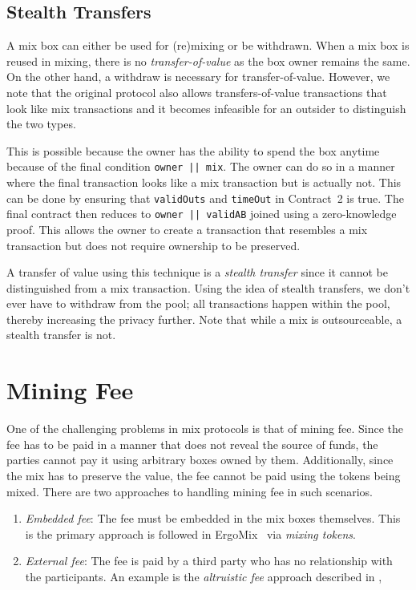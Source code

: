 \documentclass[runningheads]{llncs}
\newcommand{\ergomix}{ErgoMix\xspace}
\begin{document}
\subsection{Stealth Transfers}

A mix box can either be used for (re)mixing or be withdrawn. When a mix box is reused in mixing, there is no {\em transfer-of-value} as the box owner remains the same. On the other hand, a withdraw is necessary for transfer-of-value. However, we note that the original protocol also allows transfers-of-value transactions that look like mix transactions and it becomes infeasible for an outsider to distinguish the two types.

This is possible because the owner has the ability to spend the box anytime because of the final condition \texttt{owner || mix}. The owner can do so in a manner where the final transaction looks like a mix transaction but is actually not.
This can be done by ensuring that \texttt{validOuts} and \texttt{timeOut} in Contract~2 is true.
The final contract then reduces to \texttt{owner || validAB} joined using a zero-knowledge proof.
This allows the owner to create a transaction that resembles a mix transaction but does not require ownership to be preserved.

A transfer of value using this technique is a {\em stealth transfer} since it cannot be distinguished from a mix transaction.
Using the idea of stealth transfers, we don't ever have to withdraw from the pool; all transactions happen within the pool, thereby increasing the privacy further. Note that while a mix is outsourceable, a stealth transfer is not.

\section{Mining Fee}

One of the challenging problems in mix protocols is that of mining fee. Since the fee has to be paid in a manner that does not reveal the source of funds, the parties cannot pay it using arbitrary boxes owned by them. Additionally, since the mix has to preserve the value, the fee cannot be paid using the tokens being mixed. There are two approaches to handling mining fee in such scenarios.
\begin{enumerate}
\item {\em Embedded fee}: The fee must be embedded in the mix boxes themselves. This is the primary approach is followed in \ergomix~\cite{zerojoin} via {\em mixing tokens}.
\item {\em External fee}: The fee is paid by a third party who has no relationship with the participants. An example is the {\em altruistic fee} approach described in \cite{zerojoin},
\end{enumerate}
\end{document}
